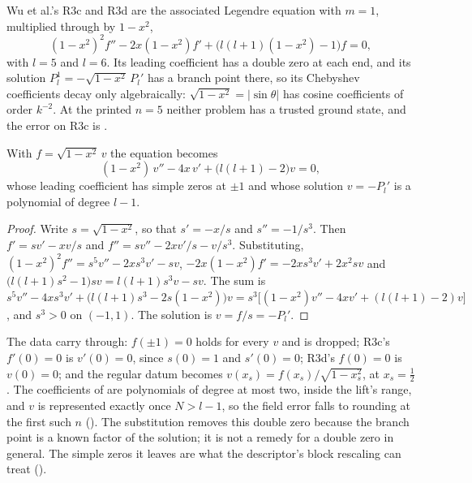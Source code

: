 Wu et al.'s R3c and R3d are the associated Legendre equation with $m=1$, multiplied through by $1-x^2$,
\begin{equation*}
    (1-x^2)^2f''-2x(1-x^2)f'+\bigl(l(l+1)(1-x^2)-1\bigr)f=0,
\end{equation*}
with $l=5$ and $l=6$. Its leading coefficient has a double zero at each end, and its solution $P_l^1=-\sqrt{1-x^2}\,P_l'$ has a branch point there, so its Chebyshev coefficients decay only algebraically: $\sqrt{1-x^2}=|\sin\theta|$ has cosine coefficients of order $k^{-2}$. At the printed $n=5$ neither problem has a trusted ground state, and the error on R3c is .

\begin{proposition}
\label{prop:legendre-substitution}
With $f=\sqrt{1-x^2}\,v$ the equation becomes
\begin{equation}
    (1-x^2)\,v''-4x\,v'+\bigl(l(l+1)-2\bigr)v=0,
    \label{eq:app-legendre-v}
\end{equation}
whose leading coefficient has simple zeros at $\pm1$ and whose solution $v=-P_l'$ is a polynomial of degree $l-1$.
\end{proposition}
\begin{proof}
Write $s=\sqrt{1-x^2}$, so that $s'=-x/s$ and $s''=-1/s^3$. Then $f'=sv'-xv/s$ and $f''=sv''-2xv'/s-v/s^3$. Substituting, $(1-x^2)^2f''=s^5v''-2xs^3v'-sv$, $-2x(1-x^2)f'=-2xs^3v'+2x^2sv$ and $\bigl(l(l+1)s^2-1\bigr)sv=l(l+1)s^3v-sv$. The sum is $s^5v''-4xs^3v'+\bigl(l(l+1)s^3-2s(1-x^2)\bigr)v=s^3\bigl[(1-x^2)v''-4xv'+(l(l+1)-2)v\bigr]$, and $s^3>0$ on $(-1,1)$. The solution is $v=f/s=-P_l'$.
\end{proof}

The data carry through: $f(\pm1)=0$ holds for every $v$ and is dropped; R3c's $f'(0)=0$ is $v'(0)=0$, since $s(0)=1$ and $s'(0)=0$; R3d's $f(0)=0$ is $v(0)=0$; and the regular datum becomes $v(x_s)=f(x_s)/\sqrt{1-x_s^2}$, at $x_s=\tfrac12$. The coefficients of  are polynomials of degree at most two, inside the lift's range, and $v$ is represented exactly once $N>l-1$, so the field error falls to rounding at the first such $n$ (). The substitution removes this double zero because the branch point is a known factor of the solution; it is not a remedy for a double zero in general. The simple zeros it leaves are what the descriptor's block rescaling can treat ().

